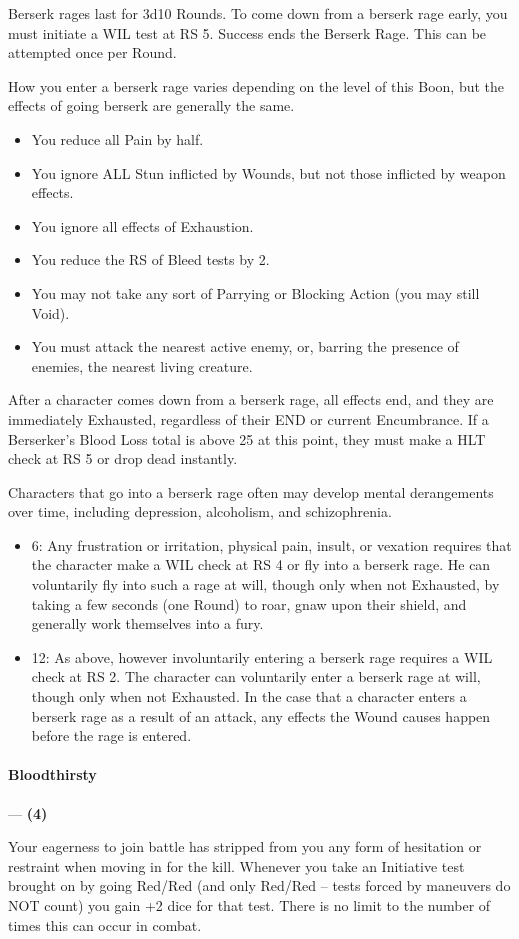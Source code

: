 \documentclass[oneside,11pt,english]{book}
\begin{document}
Berserk rages last for 3d10 Rounds. To come down from a berserk rage early, you must initiate a WIL 
test at RS 5. Success ends the Berserk Rage. This can be attempted once per Round. 


How you enter a berserk rage varies depending on the level of this Boon, but the effects of going berserk 
are generally the same. 
\begin{itemize}
\item You reduce all Pain by half. 
\item You ignore ALL Stun inflicted by Wounds, but not those inflicted by weapon effects. 
\item You ignore all effects of Exhaustion. 
\item You reduce the RS of Bleed tests by 2. 
\item You may not take any sort of Parrying or Blocking Action (you may still Void). 
\item You must attack the nearest active enemy, or, barring the presence of enemies, the nearest living 
creature. 
\end{itemize}
After a character comes down from a berserk rage, all effects end, and they are immediately Exhausted, 
regardless of their END or current Encumbrance. If a Berserker's Blood Loss total is above 25 at this 
point, they must make a HLT check at RS 5 or drop dead instantly. 


Characters that go into a berserk rage often may develop mental derangements over time, including 
depression, alcoholism, and schizophrenia. 
\begin{itemize}
\item 6: Any frustration or irritation, physical pain, insult, or vexation requires that the character make a WIL check at RS 4 or fly into a berserk rage. He can voluntarily fly into such a rage at will, though only when not Exhausted, by taking a few seconds (one Round) to roar, gnaw upon their shield, and generally work 
themselves into a fury.
\item 12: As above, however involuntarily entering a berserk rage requires a WIL check at RS 2. The character can voluntarily enter a berserk rage at will, though only when not Exhausted. In the case that a character enters a berserk rage as a result of an attack, any effects the Wound causes happen before the rage is entered.
\end{itemize}
\paragraph{\label{boon:Bloodthirsty}Bloodthirsty}---\quad \textbf{ (4)}\par
Your eagerness to join battle has stripped from you any form of hesitation or restraint when moving in for 
the kill. Whenever you take an Initiative test brought on by going Red/Red (and only Red/Red – tests forced by maneuvers do NOT count) you gain +2 dice for that test. There is no limit to the number of 
times this can occur in combat.
\end{document}

